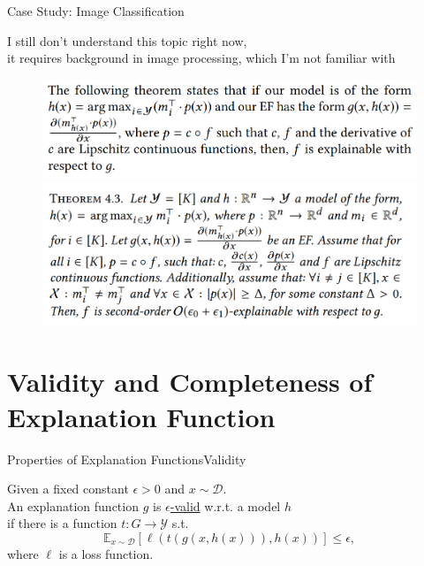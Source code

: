 \documentclass[10pt, aspectratio=169]{beamer}
\begin{document}
	\begin{frame}{Case Study: Image Classification}
		\begin{center}
			I still don't understand this topic right now,\\ it requires background in image processing, which I'm not familiar with
		\end{center}
		\begin{figure}
			\centering
			\includegraphics[width=0.7\linewidth]{screenshot001}
			\centering
			\includegraphics[width=0.7\linewidth]{screenshot002}
		\end{figure}
		
	\end{frame}
	
	\section{Validity and Completeness of Explanation Function}
	
	\begin{frame}[t]{Properties of Explanation Functions}{Validity}
		\begin{definition}
			Given a fixed constant $\epsilon>0$ and $x\sim \mathcal{D}$.\\
			An explanation function $g$ is \underline{$\epsilon$-valid} w.r.t. a model $h$\\
			if there is a function $t:G\to\mathcal{Y}$ s.t.
			$$
			\mathbb{E}_{x\sim\mathcal{D}}\left[ \ell\left(t\left(g\left(x,h\left(x\right)\right)\right),h\left(x\right)\right) \right]\leqslant\epsilon,
			$$
			where $\ell$ is a loss function.
		\end{definition}
	\end{frame}
	
\end{document}
